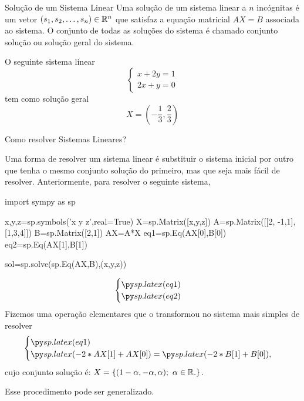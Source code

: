 \begin{frame}[label=sistemas]{Solução de um Sistema Linear}
Uma {\color{blue} solução} de um sistema linear a $n$ incógnitas é um vetor
$(s_1,s_2,\ldots,s_n)\in \mathbb{R}^n$ que satisfaz a equação matricial $AX=B$ associada ao sistema. O conjunto de todas as soluções do sistema é chamado {\color{blue} conjunto solução} ou {\color{blue} solução geral} do sistema.

\begin{exe}
O seguinte sistema linear 
\[\begin{cases}
x+2y=1\\
2x+y=0
\end{cases}\]
tem como solução geral 
\[X=\left(-\frac{1}{3},
\frac{2}{3}\right)\]
\end{exe}

\end{frame}


\begin{frame}[label=sistemas,fragile=singleslide]{Como resolver Sistemas Lineares?}

Uma forma de resolver um sistema linear é {\color{blue}substituir o sistema inicial por outro que tenha o mesmo conjunto solução do primeiro}, mas que seja mais fácil de resolver. Anteriormente, para resolver o seguinte sistema,

\begin{pycode}
import sympy as sp

x,y,z=sp.symbols('x y z',real=True)
X=sp.Matrix([x,y,z])
A=sp.Matrix([[2, -1,1],[1,3,4]])
B=sp.Matrix([2,1])
AX=A*X
eq1=sp.Eq(AX[0],B[0])
eq2=sp.Eq(AX[1],B[1])

sol=sp.solve(sp.Eq(AX,B),(x,y,z))

\end{pycode}

\[\begin{cases}
\pyl{eq1}\\
\pyl{eq2}
\end{cases}\]
Fizemos uma operação elementares que o  transformou no sistema mais simples de resolver
\[\begin{cases}
\pyl{eq1}\\
\pyl{-2*AX[1]+AX[0]}=\pyl{-2*B[1]+B[0]},
\end{cases}\]
cujo  conjunto solução é: $X=\left\{(1-\alpha,-\alpha,\alpha);\ \alpha \in \mathbb{R}.\right\}.$

Esse procedimento pode ser generalizado.
\end{frame}


